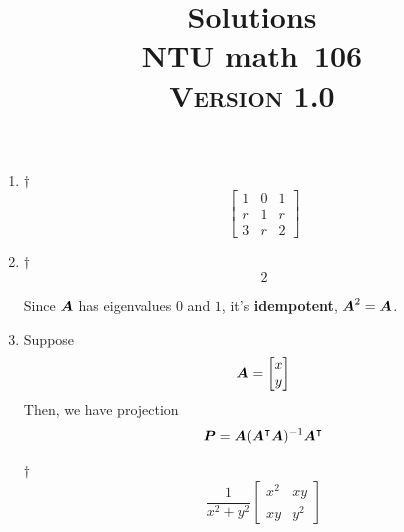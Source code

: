 \documentclass[a4paper,12pt]{article}
\newcommand{\school}{ntu}
\newcommand{\subject}{math}
\renewcommand{\year}{106}
\newcommand{\titlename}{\MakeUppercase{\school} \subject \ \year}
\newcommand{\ver}{\textsc{Version} 1.0} %
\begin{document}
\title{\LARGE{\textbf{Solutions}} \\
	\Huge{\textbf{\titlename}} \\
	\normalsize{\ver}
}
\author{}
\date{}

\maketitle


\begin{enumerate}
	\item \begin{answer}{$\dag$}\begin{equation}
            \begin{bmatrix}
                1 & 0 & 1 \\
                r & 1 & r \\
                3 & r & 2
            \end{bmatrix}    
        \end{equation}
    \end{answer}
    \item \begin{answer}{$\dag$}\begin{equation}
            2
        \end{equation}
    \end{answer} Since $\boldsymbol{A}$ has eigenvalues $0$ and $1$, it's \textbf{idempotent}, $\boldsymbol{A}^2 = \boldsymbol{A}$.
    \item Suppose \begin{equation}
        \boldsymbol{A} = \begin{bmatrix}
            x \\
            y
        \end{bmatrix}
    \end{equation} Then, we have projection \begin{equation}
        \boldsymbol{P} = \boldsymbol{A}(\boldsymbol{A}^\intercal\boldsymbol{A})^{-1}\boldsymbol{A}^\intercal
    \end{equation}
    \begin{answer}{$\dag$}\begin{equation}
            \frac{1}{x^2 + y^2}\begin{bmatrix}
                x^2 & xy \\
                xy & y^2
            \end{bmatrix}
        \end{equation}
    \end{answer}

\end{enumerate}
\end{document}
